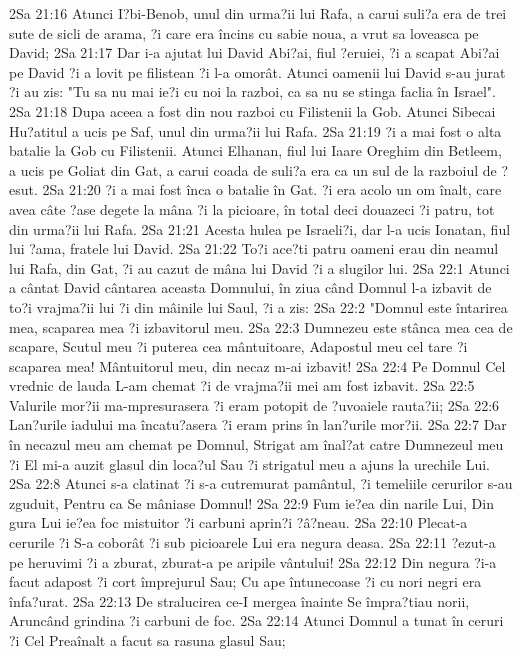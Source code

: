 2Sa 21:16  Atunci I?bi-Benob, unul din urma?ii lui Rafa, a carui suli?a era de trei sute de sicli de arama, ?i care era încins cu sabie noua, a vrut sa loveasca pe David;
2Sa 21:17  Dar i-a ajutat lui David Abi?ai, fiul ?eruiei, ?i a scapat Abi?ai pe David ?i a lovit pe filistean ?i l-a omorât. Atunci oamenii lui David s-au jurat ?i au zis: "Tu sa nu mai ie?i cu noi la razboi, ca sa nu se stinga faclia în Israel".
2Sa 21:18  Dupa aceea a fost din nou razboi cu Filistenii la Gob. Atunci Sibecai Hu?atitul a ucis pe Saf, unul din urma?ii lui Rafa.
2Sa 21:19  ?i a mai fost o alta batalie la Gob cu Filistenii. Atunci Elhanan, fiul lui Iaare Oreghim din Betleem, a ucis pe Goliat din Gat, a carui coada de suli?a era ca un sul de la razboiul de ?esut.
2Sa 21:20  ?i a mai fost înca o batalie în Gat. ?i era acolo un om înalt, care avea câte ?ase degete la mâna ?i la picioare, în total deci douazeci ?i patru, tot din urma?ii lui Rafa.
2Sa 21:21  Acesta hulea pe Israeli?i, dar l-a ucis Ionatan, fiul lui ?ama, fratele lui David.
2Sa 21:22  To?i ace?ti patru oameni erau din neamul lui Rafa, din Gat, ?i au cazut de mâna lui David ?i a slugilor lui.
2Sa 22:1  Atunci a cântat David cântarea aceasta Domnului, în ziua când Domnul l-a izbavit de to?i vrajma?ii lui ?i din mâinile lui Saul, ?i a zis:
2Sa 22:2  "Domnul este întarirea mea, scaparea mea ?i izbavitorul meu.
2Sa 22:3  Dumnezeu este stânca mea cea de scapare, Scutul meu ?i puterea cea mântuitoare, Adapostul meu cel tare ?i scaparea mea! Mântuitorul meu, din necaz m-ai izbavit!
2Sa 22:4  Pe Domnul Cel vrednic de lauda L-am chemat ?i de vrajma?ii mei am fost izbavit.
2Sa 22:5  Valurile mor?ii ma-mpresurasera ?i eram potopit de ?uvoaiele rauta?ii;
2Sa 22:6  Lan?urile iadului ma încatu?asera ?i eram prins în lan?urile mor?ii.
2Sa 22:7  Dar în necazul meu am chemat pe Domnul, Strigat am înal?at catre Dumnezeul meu ?i El mi-a auzit glasul din loca?ul Sau ?i strigatul meu a ajuns la urechile Lui.
2Sa 22:8  Atunci s-a clatinat ?i s-a cutremurat pamântul, ?i temeliile cerurilor s-au zguduit, Pentru ca Se mâniase Domnul!
2Sa 22:9  Fum ie?ea din narile Lui, Din gura Lui ie?ea foc mistuitor ?i carbuni aprin?i ?â?neau.
2Sa 22:10  Plecat-a cerurile ?i S-a coborât ?i sub picioarele Lui era negura deasa.
2Sa 22:11  ?ezut-a pe heruvimi ?i a zburat, zburat-a pe aripile vântului!
2Sa 22:12  Din negura ?i-a facut adapost ?i cort împrejurul Sau; Cu ape întunecoase ?i cu nori negri era înfa?urat.
2Sa 22:13  De stralucirea ce-I mergea înainte Se împra?tiau norii, Aruncând grindina ?i carbuni de foc.
2Sa 22:14  Atunci Domnul a tunat în ceruri ?i Cel Preaînalt a facut sa rasuna glasul Sau;
